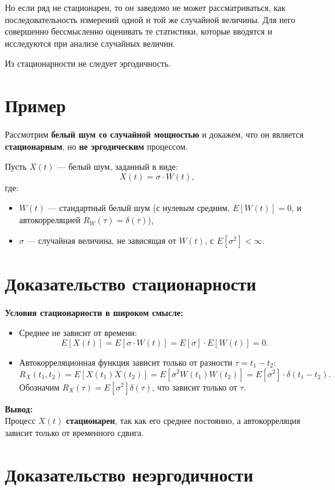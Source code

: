 Но если ряд не стационарен, то он заведомо не может
рассматриваться, как последовательность измерений одной и той же
случайной величины. Для него совершенно бессмысленно оценивать те
статистики, которые вводятся и исследуются при анализе случайных величин.

Из стационарности не следует эргодичность.

\section*{Пример}

Рассмотрим \textbf{белый шум со случайной мощностью} и докажем, что
он является \textbf{стационарным}, но \textbf{не эргодическим} процессом.

Пусть \( X(t) \) — белый шум, заданный в виде:
\[
  X(t) = \sigma \cdot W(t),
\]
где:
\begin{itemize}
  \item \( W(t) \) — стандартный белый шум (с нулевым средним, \(
    E[W(t)] = 0 \), и автокорреляцией \( R_W(\tau) = \delta(\tau) \)),
  \item \( \sigma \) — случайная величина, не зависящая от \( W(t)
    \), с \( E[\sigma^2] < \infty \).
\end{itemize}

\section*{Доказательство стационарности}
\textbf{Условия стационарности в широком смысле:}
\begin{itemize}
  \item Среднее не зависит от времени:
    \[
      E[X(t)] = E[\sigma \cdot W(t)] = E[\sigma] \cdot E[W(t)] = 0.
    \]

  \item Автокорреляционная функция зависит только от разности \( \tau
    = t_1 - t_2 \):
    \[
      R_X(t_1, t_2) = E[X(t_1)X(t_2)] = E[\sigma^2 W(t_1) W(t_2)] =
      E[\sigma^2] \cdot \delta(t_1 - t_2).
    \]
    Обозначим \( R_X(\tau) = E[\sigma^2] \delta(\tau) \), что зависит
    только от \( \tau \).
\end{itemize}

\textbf{Вывод:}\\
Процесс \( X(t) \) \textbf{стационарен}, так как его среднее
постоянно, а автокорреляция зависит только от временного сдвига.

\section*{Доказательство неэргодичности}

